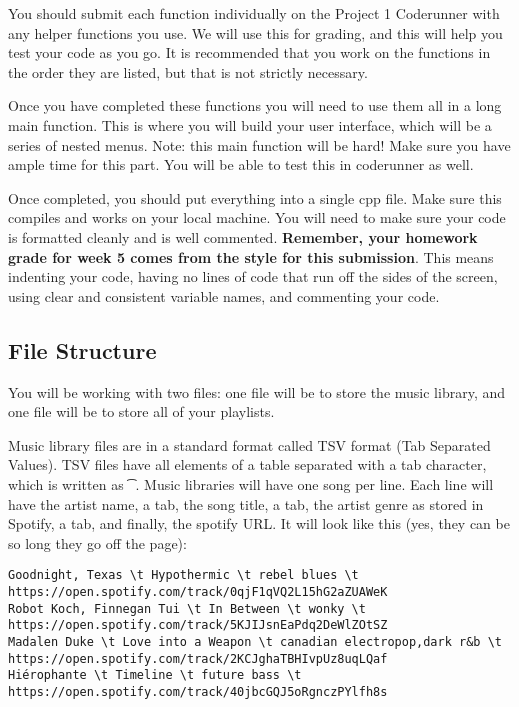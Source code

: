 You should submit each function individually on the Project 1 Coderunner with any helper functions you use. We will use this for grading, and this will help you test your code as you go. It is recommended that you work on the functions in the order they are listed, but that is not strictly necessary. 

Once you have completed these functions you will need to use them all in a long main function. This is where you will build your user interface, which will be a series of nested menus. Note: this main function will be hard! Make sure you have ample time for this part. You will be able to test this in coderunner as well.

Once completed, you should put everything into a single cpp file. Make sure this compiles and works on your local machine. You will need to make sure your code is formatted cleanly and is well commented. \textbf{Remember, your homework grade for week 5 comes from the style for this submission}. This means indenting your code, having no lines of code that run off the sides of the screen, using clear and consistent variable names, and commenting your code. 

\subsection{File Structure}
You will be working with two files: one file will be to store the music library, and one file will be to store all of your playlists. 

Music library files are in a standard format called TSV format (Tab Separated Values). TSV files have all elements of a table separated with a tab character, which is written as \texttt{\t}. Music libraries will have one song per line. Each line will have the artist name, a tab, the song title, a tab, the artist genre as stored in Spotify, a tab, and finally, the spotify URL. It will look like this (yes, they can be so long they go off the page):


\begin{verbatim}
Goodnight, Texas \t Hypothermic \t rebel blues \t https://open.spotify.com/track/0qjF1qVQ2L15hG2aZUAWeK
Robot Koch, Finnegan Tui \t In Between \t wonky \t https://open.spotify.com/track/5KJIJsnEaPdq2DeWlZOtSZ
Madalen Duke \t Love into a Weapon \t canadian electropop,dark r&b \t https://open.spotify.com/track/2KCJghaTBHIvpUz8uqLQaf
Hiérophante \t Timeline \t future bass \t https://open.spotify.com/track/40jbcGQJ5oRgnczPYlfh8s

\end{verbatim}

